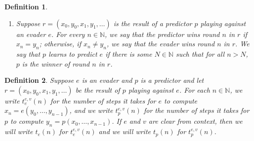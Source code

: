 \documentclass{article}
\newtheorem{definition}{Definition}
\begin{document}
\begin{definition}
\begin{enumerate}
\begin{enumerate}
            $y_{n+1}=p(x_0,\ldots,x_n)$ is
            the output of $p$ on the sequence of $e$'s first $n+1$ evasions.
            This is thought of as $p$'s $(n+1)$th prediction.
        \end{enumerate}
        \item
        Suppose $r=(x_0,y_0,x_1,y_1,\ldots)$ is the result of a predictor $p$ playing
        against an evader $e$. For every $n\in\mathbb N$,
        we say that \emph{the predictor wins round $n$ in $r$}
        if $x_n=y_n$; otherwise, if $x_n\neq y_n$, we say that
        \emph{the evader wins round $n$ in $r$}.
        We say that \emph{$p$ learns to predict $e$} if there is some $N\in\mathbb N$
        such that for all $n>N$, $p$ is the winner of round $n$ in $r$.
    \end{enumerate}
\end{definition}

\begin{definition}
    Suppose $e$ is an evader and $p$ is a predictor
    and let $r=(x_0,y_0,x_1,y_1,\ldots)$ be the result of $p$ playing
    against $e$.
    For each $n\in\mathbb N$, we write $t^{e,v}_e(n)$
    for the number of steps it takes for $e$ to compute
    $x_n=e(y_0,\ldots,y_{n-1})$, and we write
    $t^{e,v}_p(n)$ for the number of steps it takes for $p$
    to compute $y_n=p(x_0,\ldots,x_{n-1})$.
    If $e$ and $v$ are clear from context, then we will write $t_e(n)$
    for $t^{e,v}_e(n)$ and we will write $t_p(n)$ for $t^{e,v}_p(n)$.
\end{definition}



\end{document}
